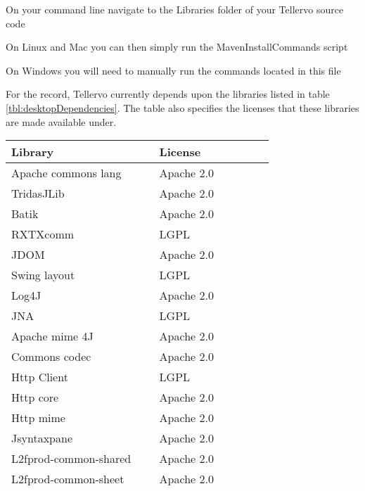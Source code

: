 \begin{itemize*}
 \item On your command line navigate to the Libraries folder of your Tellervo source code
 \item On Linux and Mac you can then simply run the MavenInstallCommands script
 \item On Windows you will need to manually run the commands located in this file
\end{itemize*}

For the record, Tellervo currently depends upon the libraries listed in table \ref{tbl:desktopDependencies}.  The table also specifies the licenses that these libraries are made available under.


\begin{table*}[htbp]
\centering
{}
\begin{tabular*}{0.6\textwidth}{ll}
\toprule
Library & License \\
\midrule
Apache commons lang & Apache 2.0 \\
TridasJLib & Apache 2.0 \\
Batik & Apache 2.0 \\ 
RXTXcomm & LGPL\\
JDOM & Apache 2.0\\
Swing layout & LGPL\\
Log4J & Apache 2.0\\
JNA & LGPL\\
Apache mime 4J & Apache 2.0\\
Commons codec & Apache 2.0\\
Http Client &LGPL\\
Http core & Apache 2.0\\
Http mime &Apache 2.0\\
Jsyntaxpane & Apache 2.0\\
L2fprod-common-shared &Apache 2.0\\
L2fprod-common-sheet &Apache 2.0\\
L2fprod-common-buttonbar &Apache 2.0\\
iText &GAPL\\
PDFRenderer & LGPL\\
DendroFileIO & Apache 2.0\\
Java Simple MVC & MIT\\
JGoogleAnalyticsTracker & MIT\\
gluegen & BSD\\
JOGL & BSD+ nuclear clause\\
WorldWindJava & NOSA \\

\end{tabular*}
\end{table*}
